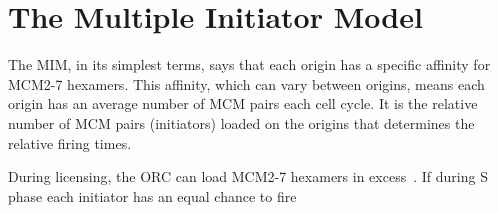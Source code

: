 	
	\section{The Multiple Initiator Model}
	\label{sec:MIM}
	
	The MIM, in its simplest terms, says that each origin has a specific affinity for MCM2-7 hexamers.
	This affinity, which can vary between origins, means each origin has an average number of MCM pairs each cell cycle.
	It is the relative number of MCM pairs (initiators) loaded on the origins that determines the relative firing times.~\cite{ScottsThesis}
	
	During licensing, the ORC can load MCM2-7 hexamers in excess~\cite{MultiMCM}.
	If during S phase each initiator has an equal chance to fire










































